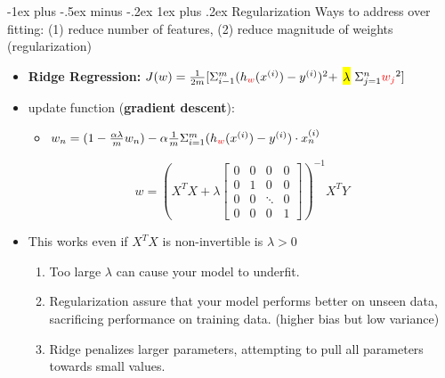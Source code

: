 \documentclass[10pt,landscape]{article}
\makeatletter
\renewcommand{\subsubsection}{\@startsection{subsubsection}{3}{0mm}%
                                {-1ex plus -.5ex minus -.2ex}%
                                {1ex plus .2ex}%
                                {\normalfont\small\bfseries}}
\makeatother
\begin{document}
\begin{multicols*}{3}
\subsubsection{Regularization } 
Ways to address over fitting: (1) reduce number of features, (2) reduce magnitude of weights (regularization)
\begin{itemize}[topsep=0pt,noitemsep,wide=0pt, leftmargin=\dimexpr{} + 2\relax]
  \item \textbf{Ridge Regression:} $J(w) = \frac{1}{2m}[\Sigma_{i-1}^{m}(h_{\textcolor{red}{w}}(x^{(i)}) - y^{(i)})^2 +$ \hl{$\lambda$} $\Sigma_{j=1}^{n}\textcolor{red}{w_j}^2]$
  \item update function (\textbf{gradient descent}): 
  \begin{itemize}[topsep=0pt,noitemsep,wide=0pt, leftmargin=\dimexpr{} + 2\relax]
    \item $w_n = (1 - \frac{\alpha\lambda}{m}w_n) - \alpha\frac{1}{m}\Sigma_{i=1}^{m} (h_{\textcolor{red}{w}}(x^{(i)}) - y^{(i)}) \cdot x^{(i)}_n$
  \end{itemize}
  \[
    w = ( X^T X + \lambda \begin{bmatrix}
    0 & 0 & 0 & 0 \\
    0 & 1 & 0 & 0 \\
    0 & 0 & \ddots & 0 \\
    0 & 0 & 0 & 1
    \end{bmatrix} )^{-1} X^T Y
  \]
  \item This works even if $ X^T X$ is non-invertible is $\lambda > 0$
  \begin{enumerate}[topsep=0pt,noitemsep,wide=0pt, leftmargin=\dimexpr\labelwidth + 2\labelsep\relax]
    \item Too large $\lambda$ can cause your model to underfit. 
    \item Regularization assure that your model performs better on unseen data, sacrificing performance on training data. (higher bias but low variance)
    \item Ridge penalizes larger parameters, attempting to pull all parameters towards small values.
  \end{enumerate}
\end{itemize}


\end{multicols*}
\end{document}
